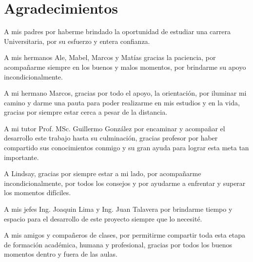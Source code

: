 \newpage

\chapter*{\centering Agradecimientos}

A mis padres por haberme brindado la oportunidad de estudiar una carrera Universitaria, por su esfuerzo y entera confianza.

A mis hermanos Ale, Mabel, Marcos y Matías gracias la paciencia, por acompañarme siempre en los buenos y malos momentos, por brindarme su apoyo incondicionalmente.

A mi hermano Marcos, gracias por todo el apoyo, la orientación, por iluminar mi camino y darme una pauta para poder realizarme en mis estudios y en la vida, gracias por siempre estar cerca a pesar de la distancia.

A mi tutor Prof. MSc. Guillermo González por encaminar y acompañar el desarrollo este trabajo hasta su culminación, gracias profesor por haber compartido sus conocimientos conmigo y su gran ayuda para lograr esta meta tan importante.

A Lindsay, gracias por siempre estar a mi lado, por acompañarme incondicionalmente, por todos los consejos y por ayudarme a enfrentar y superar los momentos difíciles.

A mis jefes Ing. Joaquin Lima y Ing. Juan Talavera por brindarme tiempo y espacio para el desarrollo de este proyecto siempre que lo necesité.

A mis amigos y compañeros de clases, por permitirme compartir toda esta etapa de formación académica, humana y profesional, gracias por todos los buenos momentos dentro y fuera de las aulas.


